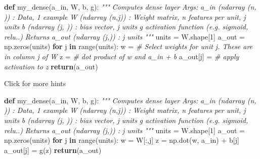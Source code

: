 \documentclass[11pt]{article}
\newenvironment{Shaded}{}{}
\newcommand{\KeywordTok}[1]{\textcolor[rgb]{0.00,0.44,0.13}{\textbf{{#1}}}}
\newcommand{\DecValTok}[1]{\textcolor[rgb]{0.25,0.63,0.44}{{#1}}}
\newcommand{\CommentTok}[1]{\textcolor[rgb]{0.38,0.63,0.69}{\textit{{#1}}}}
\newcommand{\NormalTok}[1]{{#1}}
\newcommand{\ControlFlowTok}[1]{\textcolor[rgb]{0.00,0.44,0.13}{\textbf{{#1}}}}
\newcommand{\OperatorTok}[1]{\textcolor[rgb]{0.40,0.40,0.40}{{#1}}}
\newcommand{\BuiltInTok}[1]{{#1}}
\begin{document}
\begin{Shaded}
\begin{Highlighting}[]
\KeywordTok{def}\NormalTok{ my\_dense(a\_in, W, b, g):}
    \CommentTok{"""}
\CommentTok{    Computes dense layer}
\CommentTok{    Args:}
\CommentTok{      a\_in (ndarray (n, )) : Data, 1 example }
\CommentTok{      W    (ndarray (n,j)) : Weight matrix, n features per unit, j units}
\CommentTok{      b    (ndarray (j, )) : bias vector, j units  }
\CommentTok{      g    activation function (e.g. sigmoid, relu..)}
\CommentTok{    Returns}
\CommentTok{      a\_out (ndarray (j,))  : j units}
\CommentTok{    """}
\NormalTok{    units }\OperatorTok{=}\NormalTok{ W.shape[}\DecValTok{1}\NormalTok{]}
\NormalTok{    a\_out }\OperatorTok{=}\NormalTok{ np.zeros(units)}
    \ControlFlowTok{for}\NormalTok{ j }\KeywordTok{in} \BuiltInTok{range}\NormalTok{(units):             }
\NormalTok{        w }\OperatorTok{=}                            \CommentTok{\# Select weights for unit j. These are in column j of W}
\NormalTok{        z }\OperatorTok{=}                            \CommentTok{\# dot product of w and a\_in + b}
\NormalTok{        a\_out[j] }\OperatorTok{=}                     \CommentTok{\# apply activation to z}
    \ControlFlowTok{return}\NormalTok{(a\_out)}
\end{Highlighting}
\end{Shaded}

Click for more hints

\begin{Shaded}
\begin{Highlighting}[]
\KeywordTok{def}\NormalTok{ my\_dense(a\_in, W, b, g):}
    \CommentTok{"""}
\CommentTok{    Computes dense layer}
\CommentTok{    Args:}
\CommentTok{      a\_in (ndarray (n, )) : Data, 1 example }
\CommentTok{      W    (ndarray (n,j)) : Weight matrix, n features per unit, j units}
\CommentTok{      b    (ndarray (j, )) : bias vector, j units  }
\CommentTok{      g    activation function (e.g. sigmoid, relu..)}
\CommentTok{    Returns}
\CommentTok{      a\_out (ndarray (j,))  : j units}
\CommentTok{    """}
\NormalTok{    units }\OperatorTok{=}\NormalTok{ W.shape[}\DecValTok{1}\NormalTok{]}
\NormalTok{    a\_out }\OperatorTok{=}\NormalTok{ np.zeros(units)}
    \ControlFlowTok{for}\NormalTok{ j }\KeywordTok{in} \BuiltInTok{range}\NormalTok{(units):             }
\NormalTok{        w }\OperatorTok{=}\NormalTok{ W[:,j]                     }
\NormalTok{        z }\OperatorTok{=}\NormalTok{ np.dot(w, a\_in) }\OperatorTok{+}\NormalTok{ b[j]     }
\NormalTok{        a\_out[j] }\OperatorTok{=}\NormalTok{ g(z)                }
    \ControlFlowTok{return}\NormalTok{(a\_out)}
\end{Highlighting}
\end{Shaded}
\end{document}
